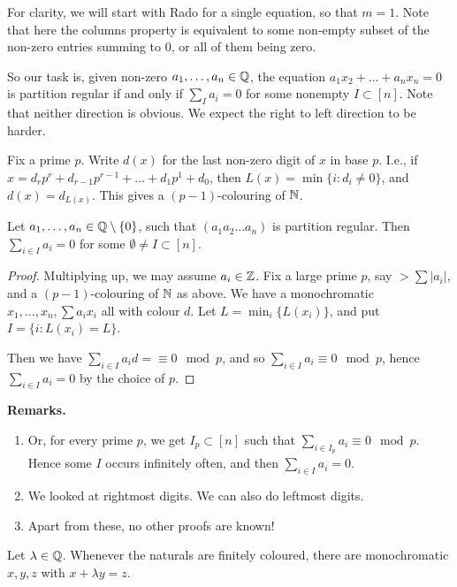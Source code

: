 \documentclass[10pt,a4paper]{article}
\begin{document}
For clarity, we will start with Rado for a single equation, so that $m = 1$. Note that here the columns property is equivalent to some non-empty subset of the non-zero entries summing to 0, or all of them being zero.

So our task is, given non-zero $a_1, \ldots, a_n \in \mathbb{Q}$, the equation $a_1x_2 +\ldots + a_nx_n = 0$ is partition regular if and only if $\sum_{I} a_i = 0$ for some nonempty $I \subset [n]$. Note that neither direction is obvious. We expect the right to left direction to be harder.

Fix a prime $p$. Write $d(x)$ for the last non-zero digit of $x$ in base $p$. I.e., if $x = d_rp^r + d_{r-1}p^{r-1} + \ldots + d_1p^1 + d_0$, then $L(x) = \min\{i:d_i \neq 0\}$, and $d(x) = d_{L(x)}$. This gives a $(p-1)$-colouring of $\mathbb{N}$.
\begin{proposition}
  Let $a_1, \ldots, a_n \in \mathbb{Q}\setminus \{0\}$, such that $(a_1 a_2 \ldots a_n)$ is partition regular. Then $\sum_{i \in I}a_i = 0$ for some $\emptyset \neq I \subset [n]$.
\end{proposition}
\begin{proof}
  Multiplying up, we may assume $a_i \in \mathbb{Z}$. Fix a large prime $p$, say $> \sum |a_i|$, and a $(p-1)$-colouring of $\mathbb{N}$ as above. We have a monochromatic $x_1, \ldots, x_n, \sum a_ix_i$ all with colour $d$. Let $L = \min_i \{L(x_i)\}$, and put $I = \{i : L(x_i) = L\}$.

  Then we have $\sum_{i \in I} a_i d =\equiv 0 \mod p$, and so $\sum_{i \in I}a_i \equiv 0 \mod p$, hence $\sum_{i \in I}a_i = 0$ by the choice of $p$.
\end{proof}
\textbf{Remarks.}
\begin{enumerate}
  \item Or, for every prime $p$, we get $I_p \subset[n]$ such that $\sum_{i \in I_p}a_i \equiv 0 \mod p$. Hence some $I$ occurs infinitely often, and then $\sum_{i \in I} a_i = 0$.
  \item We looked at rightmost digits. We can also do leftmost digits.
  \item Apart from these, no other proofs are known!
\end{enumerate}
\begin{lemma}
  Let $\lambda \in \mathbb{Q}$. Whenever the naturals are finitely coloured, there are monochromatic $x,y,z$ with $x+\lambda y = z$.
\end{lemma}
\end{document}

